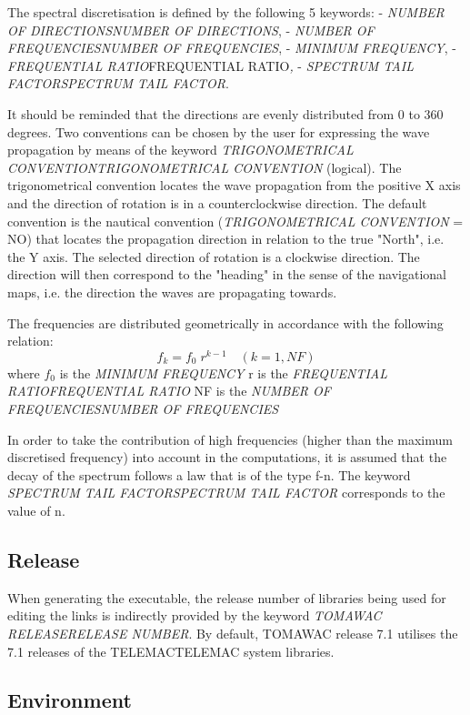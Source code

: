  The spectral discretisation is defined by the following 5 keywords:  - \textit{NUMBER OF DIRECTIONSNUMBER OF DIRECTIONS},   - \textit{NUMBER OF FREQUENCIESNUMBER OF FREQUENCIES},   - \textit{MINIMUM FREQUENCY},   - \textit{FREQUENTIAL RATIO}FREQUENTIAL RATIO\textit{,}  - \textit{SPECTRUM TAIL FACTORSPECTRUM TAIL FACTOR}.

 It should be reminded that the directions are evenly distributed from 0 to 360 degrees. Two conventions can be chosen by the user for expressing the wave propagation by means of the keyword \textit{TRIGONOMETRICAL CONVENTIONTRIGONOMETRICAL CONVENTION }(logical). The trigonometrical convention locates the wave propagation from the positive X axis and the direction of rotation is in a counterclockwise direction. The default convention is the nautical convention (\textit{TRIGONOMETRICAL CONVENTION} = NO) that locates the propagation direction in relation to the true "North", i.e. the Y axis. The selected direction of rotation is a clockwise direction. The direction will then correspond to the "heading" in the sense of the navigational maps, i.e. the direction the waves are propagating towards.

 The frequencies are distributed geometrically in accordance with the following relation:
\[f_{k} =f_{0} \; r^{k-1} \quad (k=1,NF)\]
where $f_{0} $ is the \textit{MINIMUM FREQUENCY }  r is the \textit{FREQUENTIAL RATIOFREQUENTIAL RATIO}   NF is the \textit{NUMBER OF FREQUENCIESNUMBER OF FREQUENCIES}

 In order to take the contribution of high frequencies (higher than the maximum discretised frequency) into account in the computations, it is assumed that the decay of the spectrum follows a law that is of the type f-n. The keyword \textit{SPECTRUM TAIL FACTORSPECTRUM TAIL FACTOR }corresponds to the value of n.


\subsection{ Release}

 When generating the executable, the release number of libraries being used for editing the links is indirectly provided by the keyword \textit{TOMAWAC RELEASERELEASE NUMBER}. By default, TOMAWAC release 7.1 utilises the 7.1 releases of the TELEMACTELEMAC system libraries.


\subsection{ Environment}

